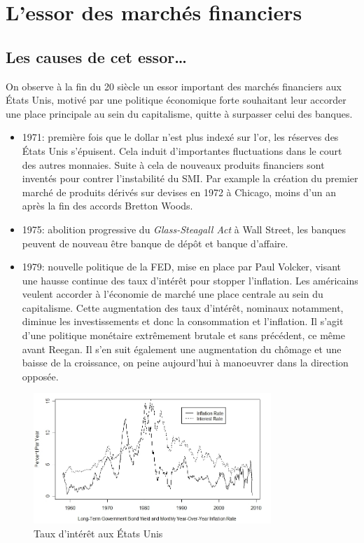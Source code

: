 \documentclass[main.tex]{subfiles}
\begin{document}
\section{L'essor des marchés financiers}

\subsection{Les causes de cet essor\ldots}

On observe à la fin du 20 siècle un essor important des marchés financiers aux États Unis, motivé par une politique économique forte souhaitant leur accorder une place principale au sein du capitalisme, quitte à surpasser celui des banques.
\begin{itemize}
        \item 1971: première fois que le dollar n'est plus indexé sur l'or, les réserves des États Unis s'épuisent. Cela induit d'importantes fluctuations dans le court des autres monnaies. Suite à cela de nouveaux produits financiers sont inventés pour contrer l'instabilité du SMI. Par example la création du premier marché de produits dérivés sur devises en 1972 à Chicago, moins d'un an après la fin des accords Bretton Woods.
        \item 1975: abolition progressive du \emph{Glass-Steagall Act} à Wall Street, les banques peuvent de nouveau être banque de dépôt et banque d'affaire. 
        \item 1979: nouvelle politique de la FED, mise en place par Paul Volcker, visant une hausse continue des taux d'intérêt pour stopper l'inflation. Les américains veulent accorder à l'économie de marché une place centrale au sein du capitalisme. Cette augmentation des taux d'intérêt, nominaux notamment, diminue les investissements et donc la consommation et l'inflation. Il s'agit d'une politique monétaire extrêmement brutale et sans précédent, ce même avant Reegan. Il s'en suit également une augmentation du chômage et une baisse de la croissance, on peine aujourd'hui  à manoeuvrer dans la direction opposée.
\end{itemize}

\begin{figure}[htpb]
        \centering
        \includegraphics[width=0.8\textwidth]{interest_rates.jpg}
        \caption{Taux d'intérêt aux États Unis}
        \label{fig:interest_rates-jpg}
\end{figure}
\end{document}

